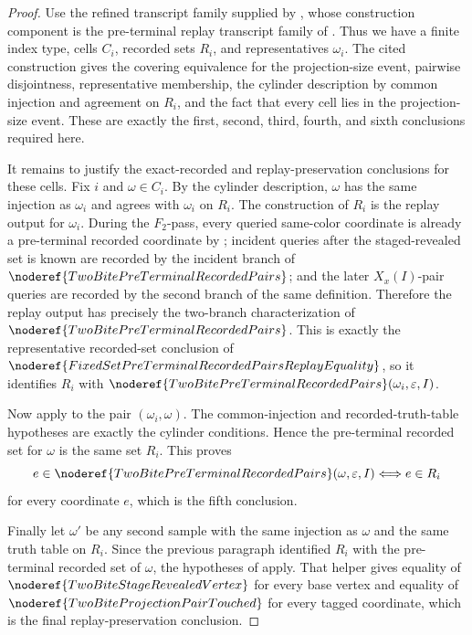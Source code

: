 \begin{proof}
Use the refined transcript family supplied by
, whose construction
component is the pre-terminal replay transcript family of
.  Thus we have a
finite index type, cells \(C_i\), recorded sets \(R_i\), and representatives
\(\omega_i\).  The cited construction gives the covering equivalence for the
projection-size event, pairwise disjointness, representative membership, the
cylinder description by common injection and agreement on \(R_i\), and the
fact that every cell lies in the projection-size event.  These are exactly the
first, second, third, fourth, and sixth conclusions required here.

It remains to justify the exact-recorded and replay-preservation conclusions
for these cells.  Fix \(i\) and \(\omega\in C_i\).  By the cylinder
description, \(\omega\) has the same injection as \(\omega_i\) and agrees with
\(\omega_i\) on \(R_i\).  The construction of \(R_i\) is the replay output for
\(\omega_i\).  During the \(F_2\)-pass, every queried same-color coordinate is
already a pre-terminal recorded coordinate by
; incident queries after the
staged-revealed set is known are recorded by the incident branch of
\(\noderef{TwoBitePreTerminalRecordedPairs}\); and the later \(X_x(I)\)-pair
queries are recorded by the second branch of the same definition.  Therefore
the replay output has precisely the two-branch characterization of
\(\noderef{TwoBitePreTerminalRecordedPairs}\).  This is exactly the
representative recorded-set conclusion of
\(\noderef{FixedSetPreTerminalRecordedPairsReplayEquality}\), so it identifies
\(R_i\) with
\(\noderef{TwoBitePreTerminalRecordedPairs}(\omega_i,\varepsilon,I)\).

Now apply  to the pair
\((\omega_i,\omega)\).  The common-injection and recorded-truth-table
hypotheses are exactly the cylinder conditions.  Hence the pre-terminal
recorded set for \(\omega\) is the same set \(R_i\).  This proves
\[
e\in\noderef{TwoBitePreTerminalRecordedPairs}(\omega,\varepsilon,I)
\Longleftrightarrow e\in R_i
\]
for every coordinate \(e\), which is the fifth conclusion.

Finally let \(\omega'\) be any second sample with the same injection as
\(\omega\) and the same truth table on \(R_i\).  Since the previous paragraph
identified \(R_i\) with the pre-terminal recorded set of \(\omega\), the
hypotheses of  apply.
That helper gives equality of
\(\noderef{TwoBiteStageRevealedVertex}\) for every base vertex and equality
of \(\noderef{TwoBiteProjectionPairTouched}\) for every tagged coordinate,
which is the final replay-preservation conclusion.
\end{proof}

